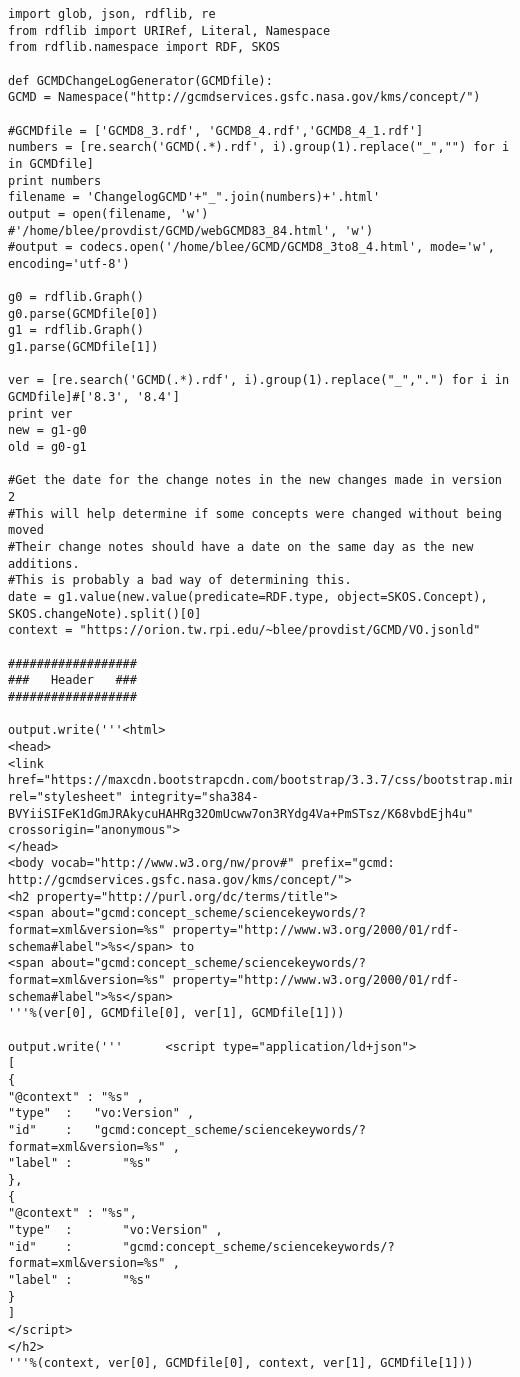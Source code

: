 \begin{verbatim}
import glob, json, rdflib, re
from rdflib import URIRef, Literal, Namespace
from rdflib.namespace import RDF, SKOS

def GCMDChangeLogGenerator(GCMDfile):
GCMD = Namespace("http://gcmdservices.gsfc.nasa.gov/kms/concept/")

#GCMDfile = ['GCMD8_3.rdf', 'GCMD8_4.rdf','GCMD8_4_1.rdf']
numbers = [re.search('GCMD(.*).rdf', i).group(1).replace("_","") for i in GCMDfile]
print numbers
filename = 'ChangelogGCMD'+"_".join(numbers)+'.html'
output = open(filename, 'w') #'/home/blee/provdist/GCMD/webGCMD83_84.html', 'w')
#output = codecs.open('/home/blee/GCMD/GCMD8_3to8_4.html', mode='w', encoding='utf-8')

g0 = rdflib.Graph()
g0.parse(GCMDfile[0])
g1 = rdflib.Graph()
g1.parse(GCMDfile[1])

ver = [re.search('GCMD(.*).rdf', i).group(1).replace("_",".") for i in GCMDfile]#['8.3', '8.4']
print ver
new = g1-g0
old = g0-g1

#Get the date for the change notes in the new changes made in version 2
#This will help determine if some concepts were changed without being moved
#Their change notes should have a date on the same day as the new additions.
#This is probably a bad way of determining this.
date = g1.value(new.value(predicate=RDF.type, object=SKOS.Concept), SKOS.changeNote).split()[0]
context = "https://orion.tw.rpi.edu/~blee/provdist/GCMD/VO.jsonld"

##################
###   Header   ###
##################

output.write('''<html>
<head>
<link href="https://maxcdn.bootstrapcdn.com/bootstrap/3.3.7/css/bootstrap.min.css" rel="stylesheet" integrity="sha384-BVYiiSIFeK1dGmJRAkycuHAHRg32OmUcww7on3RYdg4Va+PmSTsz/K68vbdEjh4u" crossorigin="anonymous">
</head>
<body vocab="http://www.w3.org/nw/prov#" prefix="gcmd: http://gcmdservices.gsfc.nasa.gov/kms/concept/">
<h2 property="http://purl.org/dc/terms/title">
<span about="gcmd:concept_scheme/sciencekeywords/?format=xml&version=%s" property="http://www.w3.org/2000/01/rdf-schema#label">%s</span> to 
<span about="gcmd:concept_scheme/sciencekeywords/?format=xml&version=%s" property="http://www.w3.org/2000/01/rdf-schema#label">%s</span>
'''%(ver[0], GCMDfile[0], ver[1], GCMDfile[1]))

output.write('''      <script type="application/ld+json">
[
{
"@context" : "%s" ,
"type"	:	"vo:Version" ,
"id"	:	"gcmd:concept_scheme/sciencekeywords/?format=xml&version=%s" ,
"label" :       "%s"
},
{
"@context" : "%s",
"type"  :       "vo:Version" ,
"id"    :       "gcmd:concept_scheme/sciencekeywords/?format=xml&version=%s" ,
"label" :       "%s"
}
]
</script>
</h2>
'''%(context, ver[0], GCMDfile[0], context, ver[1], GCMDfile[1]))


\end{verbatim}
